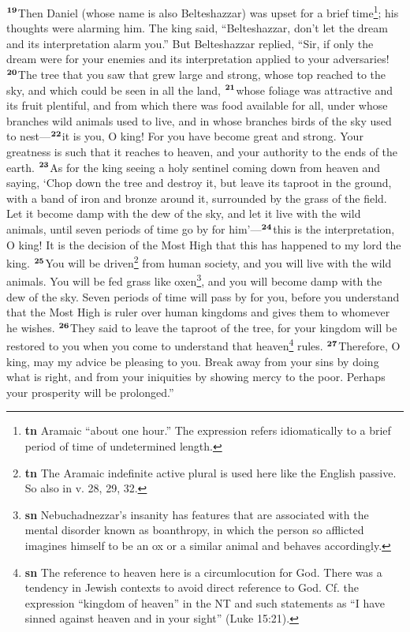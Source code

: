 \documentclass[12pt,a4paper,final]{article}
\renewcommand{\textsuperscript}[1]{\ensuremath{^{\textbf{\scriptsize #1}}}}
\begin{document}
\textsuperscript{19}Then Daniel (whose name is also Belteshazzar) was upset for a brief time\footnote{\textbf{tn} Aramaic “about one hour.” The expression refers idiomatically to a brief period of time of undetermined length.}; his thoughts were alarming him. The king said, “Belteshazzar, don’t let the dream and its interpretation alarm you.” But Belteshazzar replied, “Sir, if only the dream were for your enemies and its interpretation applied to your adversaries! \textsuperscript{20}The tree that you saw that grew large and strong, whose top reached to the sky, and which could be seen in all the land, \textsuperscript{21}whose foliage was attractive and its fruit plentiful, and from which there was food available for all, under whose branches wild animals used to live, and in whose branches birds of the sky used to nest—\textsuperscript{22}it is you, O king! For you have become great and strong. Your greatness is such that it reaches to heaven, and your authority to the ends of the earth. \textsuperscript{23}As for the king seeing a holy sentinel coming down from heaven and saying, ‘Chop down the tree and destroy it, but leave its taproot in the ground, with a band of iron and bronze around it, surrounded by the grass of the field. Let it become damp with the dew of the sky, and let it live with the wild animals, until seven periods of time go by for him’—\textsuperscript{24}this is the interpretation, O king! It is the decision of the Most High that this has happened to my lord the king. \textsuperscript{25}You will be driven\footnote{\textbf{tn} The Aramaic indefinite active plural is used here like the English passive. So also in v. 28, 29, 32.} from human society, and you will live with the wild animals. You will be fed grass like oxen\footnote{\textbf{sn} Nebuchadnezzar’s insanity has features that are associated with the mental disorder known as boanthropy, in which the person so afflicted imagines himself to be an ox or a similar animal and behaves accordingly.}, and you will become damp with the dew of the sky. Seven periods of time will pass by for you, before you understand that the Most High is ruler over human kingdoms and gives them to whomever he wishes. \textsuperscript{26}They said to leave the taproot of the tree, for your kingdom will be restored to you when you come to understand that heaven\footnote{\textbf{sn} The reference to heaven here is a circumlocution for God. There was a tendency in Jewish contexts to avoid direct reference to God. Cf. the expression “kingdom of heaven” in the NT and such statements as “I have sinned against heaven and in your sight” (Luke 15:21).} rules. \textsuperscript{27}Therefore, O king, may my advice be pleasing to you. Break away from your sins by doing what is right, and from your iniquities by showing mercy to the poor. Perhaps your prosperity will be prolonged.”
 
\end{document}
